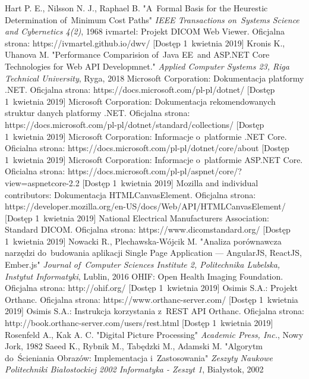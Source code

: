 \documentclass[a4paper,11pt,twoside,openright]{report}
\theoremstyle{definition}
\begin{document}
\begin{thebibliography}{24}
 Hart P. E., Nilsson N. J., Raphael B. "A~Formal Basis for the Heurestic Determination of~Minimum Cost Paths" \emph{IEEE Transactions on~Systems Science and Cybernetics 4(2)}, 1968
 ivmartel: Projekt DICOM Web Viewer. Oficjalna strona: https://ivmartel.github.io/dwv/ [Dostęp 1~kwietnia 2019]
 Kronis K., Uhanova M. "Performance Comparision of~Java EE~and ASP.NET Core Technologies for Web API Developmnet." \emph{Applied Computer Systems 23, Riga Technical University}, Ryga, 2018
 Microsoft Corporation: Dokumentacja platformy .NET. Oficjalna strona: https://docs.microsoft.com/pl-pl/dotnet/ [Dostęp 1~kwietnia 2019]
 Microsoft Corporation: Dokumentacja rekomendowanych struktur danych platformy .NET. Oficjalna strona: https://docs.microsoft.com/pl-pl/dotnet/standard/collections/ [Dostęp 1~kwietnia 2019]
 Microsoft Corporation: Informacje o~platformie .NET Core. Oficialna strona: https://docs.microsoft.com/pl-pl/dotnet/core/about [Dostęp 1~kwietnia 2019]
 Microsoft Corporation: Informacje o~platformie ASP.NET Core. Oficialna strona: https://docs.microsoft.com/pl-pl/aspnet/core/?view=aspnetcore-2.2 [Dostęp 1~kwietnia 2019]
 Mozilla and individual contributors: Dokumentacja HTMLCanvasElement. Oficjalna strona: https://developer.mozilla.org/en-US/docs/Web/API/HTMLCanvasElement/ [Dostęp 1~kwietnia 2019]
 National Electrical Manufacturers Association: Standard DICOM. Oficjalna strona: https://www.dicomstandard.org/ [Dostęp 1~kwietnia 2019]
 Nowacki R., Plechawska-Wójcik M. "Analiza porównawcza narzędzi do~budowania aplikacji Single Page Application --- AngularJS, ReactJS, Ember.js" \emph{Journal of~Computer Sciences Institute 2, Politechnika Lubelska, Instytut Informatyki}, Lublin, 2016
 OHIF: Open Health Imaging Foundation. Oficjalna strona: http://ohif.org/ [Dostęp 1~kwietnia 2019]
 Osimis S.A.: Projekt Orthanc. Oficjalna strona: https://www.orthanc-server.com/ [Dostęp 1~kwietnia 2019]
 Osimis S.A.: Instrukcja korzystania z~REST API Orthanc. Oficjalna strona: http://book.orthanc-server.com/users/rest.html [Dostęp 1~kwietnia 2019]
 Rosenfeld A., Kak A. C. "Digital Picture Processing" \emph{Academic Press, Inc.}, Nowy Jork, 1982
 Saeed K., Rybnik M., Tabędzki M., Adamski M. "Algorytm do~Ścieniania Obrazów: Implementacja i~Zastosowania" \emph{Zeszyty Naukowe Politechniki Białostockiej 2002 Informatyka - Zeszyt 1}, Białystok, 2002

\end{thebibliography}
\end{document}
